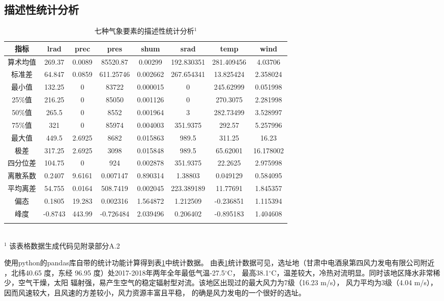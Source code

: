 \documentclass[AutoFakeBold]{LZUThesis}
\begin{document}
\subsection{描述性统计分析}

\begin{table}[H]
    \centering
    \caption{七种气象要素的描述性统计分析$^1$}
    \begin{tabular}{cccccccc}
    \toprule
    指标 & lrad & prec & pres & shum & srad & temp & wind \\
    \midrule
    算术均值 & 269.37 & 0.0089 & 85520.87 & 0.00299 & 192.830351 & 281.409456 & 4.03706 \\
    标准差 & 64.847 & 0.0859 & 611.25746 & 0.002662 & 267.654341 & 13.825424 & 2.358024 \\
    最小值 & 132.25 & 0 & 83722 & 0.000015 & 0 & 245.62999 & 0.051998 \\
    25\%值 & 216.25 & 0 & 85050 & 0.001126 & 0 & 270.3075 & 2.281998 \\
    50\%值 & 265.5 & 0 & 8552 & 0.001964 & 3 & 282.73499 & 3.528997 \\
    75\%值 & 321 & 0 & 85974 & 0.004003 & 351.9375 & 292.57 & 5.257996 \\
    最大值 & 449.5 & 2.6925 & 8682 & 0.015863 & 989.5 & 311.25 & 16.23 \\
    极差 & 317.25 & 2.6925 & 3098 & 0.015848 & 989.5 & 65.62001 & 16.178002 \\
    四分位差 & 104.75 & 0 & 924 & 0.002878 & 351.9375 & 22.2625 & 2.975998 \\
    离散系数 & 0.2407 & 9.6161 & 0.007147 & 0.890314 & 1.38803 & 0.049129 & 0.584095 \\
    平均离差 & 54.755 & 0.0164 & 508.7419 & 0.002045 & 223.389189 & 11.77691 & 1.845357 \\
    偏态 & 0.1805 & 19.283 & 0.002316 & 1.564872 & 1.212509 & -0.236851 & 1.115394 \\
    峰度 & -0.8743 & 443.99 & -0.726484 & 2.039496 & 0.206402 & -0.895183 & 1.404608 \\
    \bottomrule \\
    \end{tabular} \\
    \footnotesize{$^1$ 该表格数据生成代码见附录部分A.2} \\
    \label{analysis}
\end{table}

使用python的pandas库自带的统计功能计算得到表\ref{analysis}中统计数据。
由表\ref{analysis}统计数据可见，选址地（甘肃中电酒泉第四风力发电有限公司附近
，北纬40.65 度，东经 96.95 度）处2017-2018年两年全年最低气温-27.5$^{\circ}$C，
最高38.1$^{\circ}$C，温差较大，冷热对流明显。同时该地区降水非常稀少，空气干燥，太阳
辐射强，易产生空气的稳定辐射型对流。该地区出现过的最大风力为7级（16.23 m/s），
风力平均为3级（4.04 m/s），因而风速较大，且风速的方差较小，风力资源丰富且平稳，
的确是风力发电的一个很好的选址。
\end{document}
